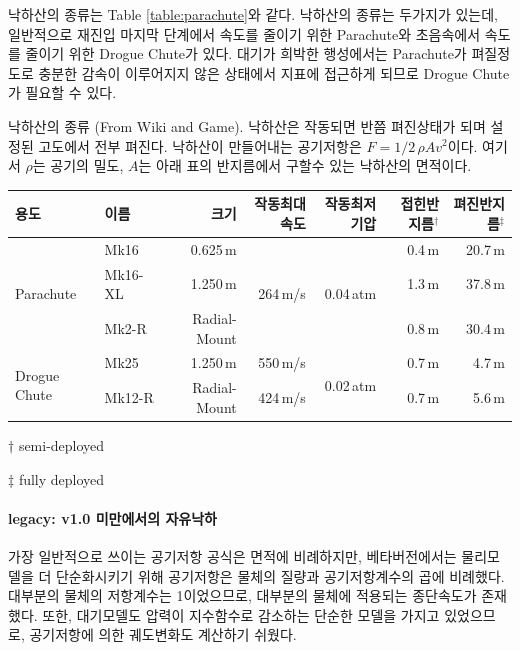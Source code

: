 \documentclass[9pt,twoside,openany]{amsbook}
\begin{document}
낙하산의 종류는 Table \ref{table:parachute}와 같다. 낙하산의 종류는 두가지가 있는데, 일반적으로 재진입 마지막 단계에서 속도를 줄이기 위한 Parachute와 초음속에서 속도를 줄이기 위한 Drogue Chute가 있다. 대기가 희박한 행성에서는 Parachute가 펴질정도로 충분한 감속이 이루어지지 않은 상태에서 지표에 접근하게 되므로 Drogue Chute가 필요할 수 있다.

\begin{center}
\begin{adjustbox}{width=\textwidth}
\begin{threeparttable}
\caption{
낙하산의 종류
(From Wiki and Game). 
낙하산은 작동되면 반쯤 펴진상태가 되며 설정된 고도에서 전부 펴진다. 
낙하산이 만들어내는 공기저항은 $F = 1/2 \,\rho A v^2$이다. 
여기서 $\rho$는 공기의 밀도, $A$는 아래 표의 반지름에서 구할수 있는 낙하산의 면적이다.}
\label{table:parachute}
\begin{tabular}{|l|l|r|r|r|r|r|}
\hline
용도&이름&크기&작동최대속도&작동최저기압&접힌반지름$^\dagger$&펴진반지름$^\ddagger$
\\\hline
\multirow{3}{*}{Parachute}&Mk16&0.625\,m&\multirow{3}{*}{264\,m/s}&\multirow{3}{*}{0.04\,atm}
&0.4\,m&20.7\,m
\\
&Mk16-XL&1.250\,m&&&1.3\,m&37.8\,m
\\
&Mk2-R &Radial-Mount&&&0.8\,m&30.4\,m
\\\hline
\multirow{2}{*}{Drogue Chute}&Mk25&1.250\,m&550\,m/s&\multirow{2}{*}{0.02\,atm}&0.7\,m&4.7\,m
\\
&Mk12-R &Radial-Mount&424\,m/s&&0.7\,m&5.6\,m
\\\hline
\end{tabular}
\begin{tablenotes}
\item[$\dagger$] semi-deployed
\item[$\ddagger$] fully deployed
\end{tablenotes}
\end{threeparttable}
\end{adjustbox}
\end{center}


\paragraph{legacy: v1.0 미만에서의 자유낙하}
가장 일반적으로 쓰이는 공기저항 공식은 면적에 비례하지만, 
베타버전에서는 물리모델을 더 단순화시키기 위해 공기저항은 물체의 질량과 공기저항계수의 곱에 비례했다.
대부분의 물체의 저항계수는 1이었으므로,
대부분의 물체에 적용되는 종단속도가 존재했다.
또한, 대기모델도 압력이 지수함수로 감소하는 단순한 모델을 가지고 있었으므로,
공기저항에 의한 궤도변화도 계산하기 쉬웠다.
\end{document}
